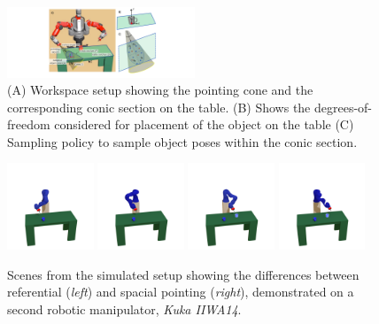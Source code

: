 
\begin{figure}[th!]
    \centering
    \includegraphics[width=0.5\textwidth]{pointing_diagram}
    \caption{(A) Workspace setup showing the pointing cone and the corresponding conic section on the table. (B) Shows the degrees-of-freedom considered for placement of the object on the table (C) Sampling policy to sample object poses within the conic section.}
    \label{fig:pointing}
\end{figure}

\begin{figure}[h!]
    \centering
    \includegraphics[width=0.23\textwidth, trim={3in 4in 4in 4in},clip]{figures/img11.png}
    \includegraphics[width=0.23\textwidth, trim={3in 4in 4in 4in},clip]{figures/img21.png}
    \includegraphics[width=0.23\textwidth, trim={3in 4in 4in 4in},clip]{figures/img12.png}
    \includegraphics[width=0.23\textwidth, trim={3in 4in 4in 4in},clip]{figures/img22.png}
    \caption{Scenes from the simulated setup showing the differences between referential (\textit{left}) and spacial pointing (\textit{right}), demonstrated on a second robotic manipulator, \textit{Kuka IIWA14}.}
    \label{fig:spatial}
\end{figure}

